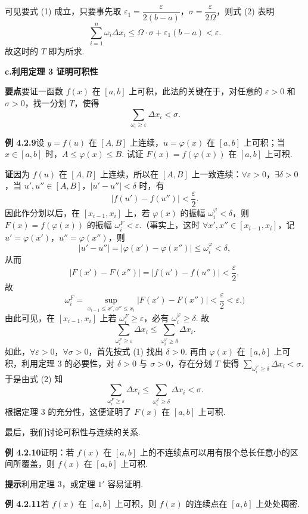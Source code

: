 \documentclass[UTF8,12pt,a4paper,fontset=fandol]{ctexart}
\begin{document}
可见要式 (1) 成立，只要事先取 $\varepsilon_1=\dfrac{\varepsilon}{2(b-a)}$，$\sigma=\dfrac{\varepsilon}{2\Omega}$，则式 (2) 表明
\[
\sum_{i=1}^n\omega_i\Delta x_i\le\Omega\cdot\sigma+\varepsilon_1(b-a)<\varepsilon.
\]
故这时的 $T$ 即为所求.

\noindent\textbf{c.\quad 利用定理 3 证明可积性}

\noindent\textbf{要点}\quad 要证一函数 $f(x)$ 在 $[a,b]$ 上可积，此法的关键在于，对任意的 $\varepsilon>0$ 和 $\sigma>0$，找一分划 $T$，使得
\[
\sum_{\omega_i\ge\varepsilon}\Delta x_i<\sigma.
\]

\noindent\textbf{例 4.2.9}\quad 设 $y=f(u)$ 在 $[A,B]$ 上连续，$u=\varphi(x)$ 在 $[a,b]$ 上可积；当 $x\in[a,b]$ 时，$A\le\varphi(x)\le B$. 试证 $F(x)=f(\varphi(x))$ 在 $[a,b]$ 上可积.

\noindent\textbf{证}\quad 因为 $f(u)$ 在 $[A,B]$ 上连续，所以在 $[A,B]$ 上一致连续：$\forall\varepsilon>0$，$\exists\delta>0$，当 $u',u''\in[A,B]$，$|u'-u''|<\delta$ 时，有
\[
|f(u')-f(u'')|<\frac{\varepsilon}{2}.
\tag{1}
\]
因此作分划以后，在 $[x_{i-1},x_i]$ 上，若 $\varphi(x)$ 的振幅 $\omega_i^\varphi<\delta$，则 $F(x)=f(\varphi(x))$ 的振幅 $\omega_i^F<\varepsilon$.（事实上，这时 $\forall x',x''\in[x_{i-1},x_i]$，记 $u'=\varphi(x')$，$u''=\varphi(x'')$，则
\[
|u'-u''|=|\varphi(x')-\varphi(x'')|\le\omega_i^\varphi<\delta,
\]
从而
\[
|F(x')-F(x'')|=|f(u')-f(u'')|<\frac{\varepsilon}{2},
\]
故
\[
\omega_i^F=\sup_{x_{i-1}\le x',x''\le x_i}|F(x')-F(x'')|<\frac{\varepsilon}{2}<\varepsilon.)
\]
由此可见，在 $[x_{i-1},x_i]$ 上若 $\omega_i^F\ge\varepsilon$，必有 $\omega_i^\varphi\ge\delta$. 故
\[
\sum_{\omega_i^F\ge\varepsilon}\Delta x_i
\le
\sum_{\omega_i^\varphi\ge\delta}\Delta x_i.
\tag{2}
\]
如此，$\forall\varepsilon>0$，$\forall\sigma>0$，首先按式 (1) 找出 $\delta>0$. 再由 $\varphi(x)$ 在 $[a,b]$ 上可积，利用定理 3 的必要性，对 $\delta>0$ 与 $\sigma>0$，存在分划 $T$ 使得 $\sum_{\omega_i^\varphi\ge\delta}\Delta x_i<\sigma$. 于是由式 (2) 知
\[
\sum_{\omega_i^F\ge\varepsilon}\Delta x_i\le\sum_{\omega_i^\varphi\ge\delta}\Delta x_i<\sigma.
\]
根据定理 3 的充分性，这便证明了 $F(x)$ 在 $[a,b]$ 上可积.

最后，我们讨论可积性与连续的关系.

\noindent\textbf{例 4.2.10}\quad 证明：若 $f(x)$ 在 $[a,b]$ 上的不连续点可以用有限个总长任意小的区间所覆盖，则 $f(x)$ 在 $[a,b]$ 上可积.

\noindent\textbf{提示}\quad 利用定理 3，或定理 $1'$ 容易证明.

\noindent\textbf{例 4.2.11}\quad 若 $f(x)$ 在 $[a,b]$ 上可积，则 $f(x)$ 的连续点在 $[a,b]$ 上处处稠密.
\end{document}
